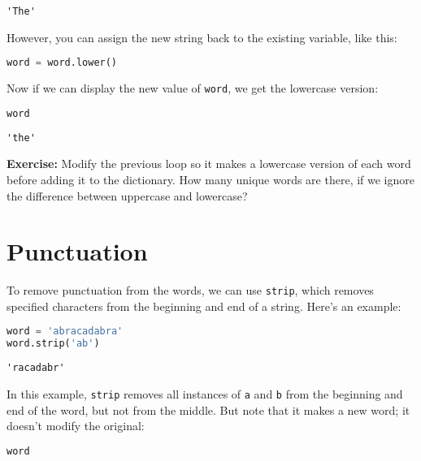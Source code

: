 \begin{lstlisting}[style=output]
'The'
\end{lstlisting}

However, you can assign the new string back to the existing variable,
like this:

\begin{lstlisting}[language=Python,style=source]
word = word.lower()
\end{lstlisting}

Now if we can display the new value of \passthrough{\lstinline!word!},
we get the lowercase version:

\begin{lstlisting}[language=Python,style=source]
word
\end{lstlisting}

\begin{lstlisting}[style=output]
'the'
\end{lstlisting}

\textbf{Exercise:} Modify the previous loop so it makes a lowercase
version of each word before adding it to the dictionary. How many unique
words are there, if we ignore the difference between uppercase and
lowercase?

\hypertarget{punctuation}{%
\section{Punctuation}\label{punctuation}}

To remove punctuation from the words, we can use
\passthrough{\lstinline!strip!}, which removes specified characters from
the beginning and end of a string. Here's an example:

\begin{lstlisting}[language=Python,style=source]
word = 'abracadabra'
word.strip('ab')
\end{lstlisting}

\begin{lstlisting}[style=output]
'racadabr'
\end{lstlisting}

In this example, \passthrough{\lstinline!strip!} removes all instances
of \passthrough{\lstinline!a!} and \passthrough{\lstinline!b!} from the
beginning and end of the word, but not from the middle. But note that it
makes a new word; it doesn't modify the original:

\begin{lstlisting}[language=Python,style=source]
word
\end{lstlisting}


